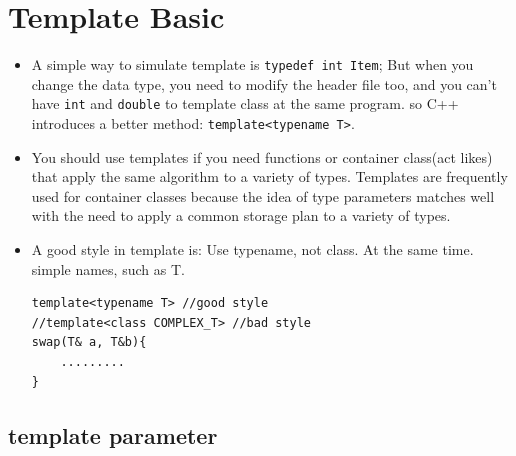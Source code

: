 \documentclass[a4paper,11pt,twoside]{book}
\begin{document}
\section{Template Basic}
\begin{itemize}
\item A simple way to simulate template is \verb=typedef int Item=; But when you change the data type, you need to modify the header file too, and you can't have \texttt{int} and \texttt{double} to template class at the same program. so C++ introduces a better method: \texttt{template<typename T>}.

\item You should use templates if you need functions or container class(act likes) that apply the same algorithm to a variety of types. Templates are frequently used for container classes because the idea of type parameters matches well with the need to apply a common storage plan to a variety of types.

\item A good style in template is: Use typename, not class. At the same time. simple names, such as T.
\begin{lstlisting}[numbers=none]
template<typename T> //good style
//template<class COMPLEX_T> //bad style
swap(T& a, T&b){
	.........
}
\end{lstlisting}

\end{itemize}

\subsection{template parameter}
\end{document}
